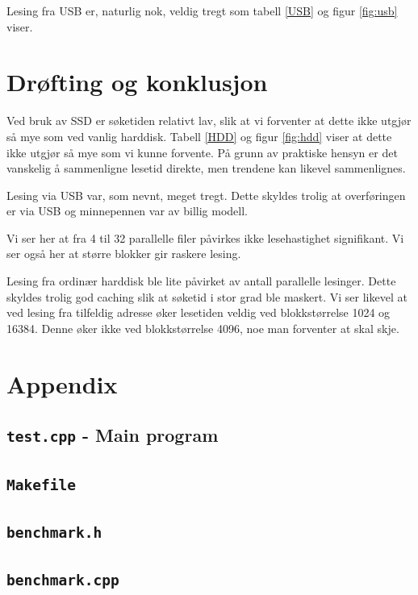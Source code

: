 \documentclass[titlepage]{article}
\begin{document}
Lesing fra USB er, naturlig nok, veldig tregt som tabell \ref{USB} og
figur \ref{fig:usb} viser.

\section{Drøfting og konklusjon}
Ved bruk av SSD er søketiden relativt lav, slik at vi forventer at
dette ikke utgjør så mye som ved vanlig harddisk. Tabell \ref{HDD} og
figur \ref{fig:hdd} viser at dette ikke utgjør så mye som vi kunne
forvente.  På grunn av praktiske hensyn er det vanskelig å sammenligne
lesetid direkte, men trendene kan likevel sammenlignes.

Lesing via USB var, som nevnt, meget tregt.  Dette skyldes trolig at
overføringen er via USB og minnepennen var av billig modell.

Vi ser her at fra 4 til 32 parallelle filer påvirkes ikke
lesehastighet signifikant. Vi ser også her at større blokker gir
raskere lesing.

Lesing fra ordinær harddisk ble lite påvirket av antall parallelle
lesinger. Dette skyldes trolig god caching slik at søketid i stor grad
ble maskert. Vi ser likevel at ved lesing fra tilfeldig adresse øker
lesetiden veldig ved blokkstørrelse 1024 og 16384. Denne øker ikke ved
blokkstørrelse 4096, noe man forventer at skal skje.



\clearpage
\section{Appendix}

\clearpage
\subsection{\texttt{test.cpp} - Main program}


\subsection{\texttt{Makefile}}


\clearpage
\subsection{\texttt{benchmark.h}}


\clearpage
\subsection{\texttt{benchmark.cpp}}

\end{document}
